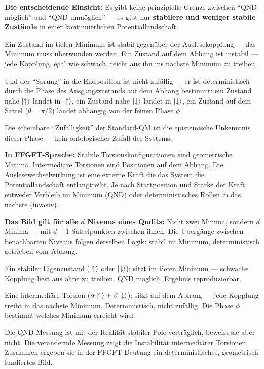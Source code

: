 \begin{foundation}
\textbf{Die entscheidende Einsicht:}
Es gibt keine prinzipielle Grenze zwischen
``QND-möglich'' und ``QND-unmöglich'' ---
es gibt nur \textbf{stabilere und weniger stabile Zustände}
in einer kontinuierlichen Potentiallandschaft.

Ein Zustand im tiefen Minimum ist stabil gegenüber
der Auslesekopplung --- das Minimum muss überwunden werden.
Ein Zustand auf dem Abhang ist instabil ---
jede Kopplung, egal wie schwach, reicht aus ihn
ins nächste Minimum zu treiben.

Und der ``Sprung'' in die Endposition ist nicht zufällig ---
er ist deterministisch durch die Phase des Ausgangszustands
auf dem Abhang bestimmt:
ein Zustand nahe $\left|\uparrow\right\rangle$ landet in $\left|\uparrow\right\rangle$,
ein Zustand nahe $\left|\downarrow\right\rangle$ landet in $\left|\downarrow\right\rangle$,
ein Zustand auf dem Sattel ($\theta = \pi/2$) landet
abhängig von der feinen Phase $\phi$.

Die scheinbare ``Zufälligkeit'' der Standard-QM
ist die epistemische Unkenntnis dieser Phase ---
kein ontologischer Zufall des Systems.

\textbf{In FFGFT-Sprache:}
Stabile Torsionskonfigurationen sind geometrische Minima.
Intermediäre Torsionen sind Positionen auf dem Abhang.
Die Auslesewechselwirkung ist eine externe Kraft
die das System die Potentiallandschaft entlangtreibt.
Je nach Startposition und Stärke der Kraft:
entweder Verbleib im Minimum (QND)
oder deterministisches Rollen in das nächste (invasiv).

\textbf{Das Bild gilt für alle $d$ Niveaus eines Qudits:}
Nicht zwei Minima, sondern $d$ Minima ---
mit $d-1$ Sattelpunkten zwischen ihnen.
Die Übergänge zwischen benachbarten Niveaus
folgen derselben Logik: stabil im Minimum,
deterministisch getrieben vom Abhang.
\end{foundation}

\begin{keypoint}
Ein stabiler Eigenzustand ($\left|\uparrow\right\rangle$ oder $\left|\downarrow\right\rangle$):
sitzt im tiefen Minimum --- schwache Kopplung liest aus
ohne zu treiben. QND möglich. Ergebnis reproduzierbar.

Eine intermediäre Torsion ($\alpha\left|\uparrow\right\rangle+\beta\left|\downarrow\right\rangle$):
sitzt auf dem Abhang --- jede Kopplung treibt
in das nächste Minimum. Deterministisch, nicht zufällig.
Die Phase $\phi$ bestimmt welches Minimum erreicht wird.

Die QND-Messung ist mit der Realität stabiler Pole verträglich,
beweist sie aber nicht.
Die verändernde Messung zeigt die Instabilität
intermediärer Torsionen.
Zusammen ergeben sie in der FFGFT-Deutung ein deterministisches,
geometrisch fundiertes Bild.
\end{keypoint}

